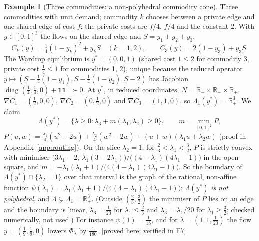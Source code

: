\documentclass[11pt,a4paper]{article}
\theoremstyle{plain}
\theoremstyle{definition}
\newtheorem{example}[theorem]{Example}
\theoremstyle{remark}
\newcommand{\R}{\mathbb{R}}
\newcommand{\NC}{N}
\newcommand{\status}[1]{\textsf{\small [#1]}}
\newcommand{\Lam}{\Lambda}
\newcommand{\Lone}{\Lambda_{1}}
\begin{document}
\begin{example}[Three commodities: a non-polyhedral commodity cone]\label{ex:three}
Three commodities with unit demand; commodity $k$ chooses between a private edge and one shared edge of cost $f$; the private costs are $f/4$, $f/4$ and the constant $2$. With $y\in[0,1]^3$ the flows on the shared edge and $S=y_1+y_2+y_3$,
\[
C_k(y)=\tfrac14(1-y_k)^2+y_kS\quad(k=1,2),\qquad C_3(y)=2(1-y_3)+y_3S .
\]
The Wardrop equilibrium is $y^*=(0,0,1)$ (shared cost $1\le2$ for commodity 3, private cost $\tfrac14\le1$ for commodities 1, 2), unique because the reduced operator $y\mapsto(S-\tfrac14(1-y_1),S-\tfrac14(1-y_2),S-2)$ has Jacobian $\operatorname{diag}(\tfrac14,\tfrac14,0)+\mathbf 1\mathbf 1^{\!\top}\succ0$. At $y^*$, in reduced coordinates, $\NC=\R_-\times\R_-\times\R_+$, $\nabla C_1=(\tfrac12,0,0)$, $\nabla C_2=(0,\tfrac12,0)$ and $\nabla C_3=(1,1,0)$, so $\Lone(y^*)=\R^3_+$. We claim
\[
\Lam(y^*)=\{\lambda\ge0:\lambda_3+m(\lambda_1,\lambda_2)\ge0\},\qquad m=\min_{[0,1]^2}P,
\]
$P(u,w)=\tfrac{\lambda_1}4(u^2-2u)+\tfrac{\lambda_2}4(w^2-2w)+(u+w)(\lambda_1u+\lambda_2w)$ (proof in Appendix~\ref{app:routing}). On the slice $\lambda_2=1$, for $\tfrac23<\lambda_1<\tfrac32$, $P$ is strictly convex with minimiser $\big(3\lambda_1-2,\ \lambda_1(3-2\lambda_1)\big)/\big((4-\lambda_1)(4\lambda_1-1)\big)$ in the open square, and $m=-\lambda_1(\lambda_1+1)/\big(4(4-\lambda_1)(4\lambda_1-1)\big)$. So the boundary of $\Lam(y^*)\cap\{\lambda_2=1\}$ over that interval is the graph of the rational, non-affine function $\psi(\lambda_1)=\lambda_1(\lambda_1+1)/\big(4(4-\lambda_1)(4\lambda_1-1)\big)$: $\Lam(y^*)$ \emph{is not polyhedral}, and $\Lam\subsetneq\Lone=\R^3_+$. (Outside $(\tfrac23,\tfrac32)$ the minimiser of $P$ lies on an edge and the boundary is linear, $\lambda_3=\tfrac1{20}$ for $\lambda_1\le\tfrac23$ and $\lambda_3=\lambda_1/20$ for $\lambda_1\ge\tfrac32$; checked numerically, not used.) For instance $\psi(1)=\tfrac1{18}$, and for $\lambda=(1,1,\tfrac1{20})$ the flow $y=(\tfrac19,\tfrac19,0)$ lowers $\Phi_\lambda$ by $\tfrac1{180}$. \status{proved here; verified in E7}
\end{example}
\end{document}

